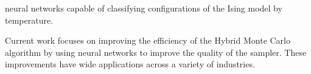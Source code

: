 \begin{cventries}
{\begin{cvitems}
{                  neural networks capable of classifying configurations of the
                  Ising model by temperature.}
          \item {Current work focuses on improving the efficiency of the Hybrid
                  Monte Carlo algorithm by using neural networks to improve the
                  quality of the sampler. These improvements have wide applications
                  across a variety of industries.}
      \end{cvitems}
  }
\end{cventries}




